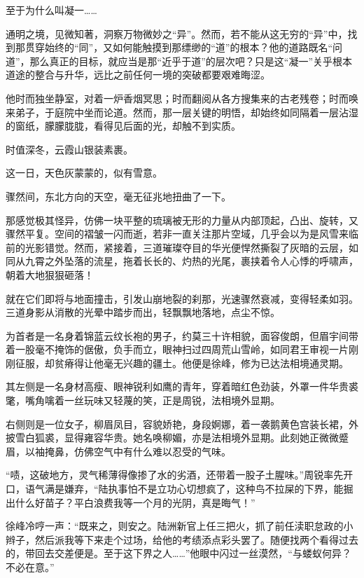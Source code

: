 至于为什么叫凝一……

通明之境，见微知著，洞察万物微妙之“异”。然而，若不能从这无穷的“异”中，找到那贯穿始终的“同”，又如何能触摸到那缥缈的“道”的根本？他的道路既名“问道”，那么真正的目标，就应当是那“近乎于道”的层次吧？只是这“凝一”关乎根本道途的整合与升华，远比之前任何一境的突破都要艰难晦涩。

他时而独坐静室，对着一炉香烟冥思；时而翻阅从各方搜集来的古老残卷；时而唤来弟子，于庭院中坐而论道。然而，那一层关键的明悟，却始终如同隔着一层沾湿的窗纸，朦朦胧胧，看得见后面的光，却触不到实质。

\vspace{2em}

时值深冬，云霞山银装素裹。

这一日，天色灰蒙蒙的，似有雪意。

骤然间，东北方向的天空，毫无征兆地扭曲了一下。

那感觉极其怪异，仿佛一块平整的琉璃被无形的力量从内部顶起，凸出、旋转，又骤然平复。空间的褶皱一闪而逝，若非一直关注那片空域，几乎会以为是风雪来临前的光影错觉。然而，紧接着，三道璀璨夺目的华光便悍然撕裂了灰暗的云层，如同从九霄之外坠落的流星，拖着长长的、灼热的光尾，裹挟着令人心悸的呼啸声，朝着大地狠狠砸落！

就在它们即将与地面撞击，引发山崩地裂的刹那，光速骤然衰减，变得轻柔如羽。三道身影从消散的光晕中踏步而出，轻飘飘地落地，点尘不惊。

为首者是一名身着锦蓝云纹长袍的男子，约莫三十许相貌，面容俊朗，但眉宇间带着一股毫不掩饰的倨傲，负手而立，眼神扫过四周荒山雪岭，如同君王审视一片刚刚征服，却贫瘠得让他毫无兴趣的疆土。他便是徐峰，修为已达法相境通灵期。

其左侧是一名身材高瘦、眼神锐利如鹰的青年，穿着暗红色劲装，外罩一件华贵裘氅，嘴角噙着一丝玩味又轻蔑的笑，正是周锐，法相境外显期。

右侧则是一位女子，柳眉凤目，容貌娇艳，身段婀娜，着一袭鹅黄色宫装长裙，外披雪白狐裘，显得雍容华贵。她名唤柳媚，亦是法相境外显期。此刻她正微微蹙眉，以袖掩鼻，仿佛空气中有什么难以忍受的气味。

“啧，这破地方，灵气稀薄得像掺了水的劣酒，还带着一股子土腥味。”周锐率先开口，语气满是嫌弃，“陆执事怕不是立功心切想疯了，这种鸟不拉屎的下界，能掘出什么好苗子？平白浪费我等一个月的光阴，真是晦气！”

徐峰冷哼一声：“既来之，则安之。陆洲新官上任三把火，抓了前任渎职怠政的小辫子，然后派我等下来走个过场，给他的考绩添点彩头罢了。随便找两个看得过去的，带回去交差便是。至于这下界之人……”他眼中闪过一丝漠然，“与蝼蚁何异？不必在意。”

